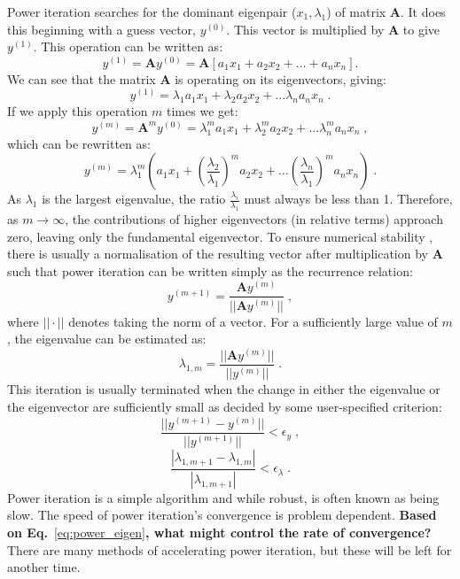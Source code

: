 \documentclass{article}
\begin{document}
Power iteration searches for the dominant eigenpair ($x_1,\lambda_1$) of matrix $\mathbf{A}$. It does this beginning with a guess vector, $y^{(0)}$. This vector is multiplied by $\mathbf{A}$ to give $y^{(1)}$. This operation can be written as:
\begin{equation}
    y^{(1)} = \mathbf{A}y^{(0)} = \mathbf{A}\left[a_1 x_1 + a_2 x_2 +\ldots + a_n x_n\right]\mathrm{.}
\end{equation}
We can see that the matrix $\mathbf{A}$ is operating on its eigenvectors, giving:
\begin{equation}
    y^{(1)} = \lambda_1 a_1 x_1 + \lambda_2 a_2 x_2 + \ldots \lambda_n a_n x_n\;\mathrm{.}
\end{equation}
If we apply this operation $m$ times we get:
\begin{equation}
    y^{(m)} = \mathbf{A}^m y^{(0)} = \lambda^m_1 a_1 x_1 + \lambda^m_2 a_2 x_2 + \ldots \lambda^m_n a_n x_n\;\mathrm{,}
\end{equation}
which can be rewritten as:
\begin{equation}\label{eq:power_eigen}
    y^{(m)} = \lambda^m_1 \left(a_1 x_1 + \left(\frac{\lambda_2}{\lambda_1}\right)^m a_2 x_2 + \ldots \left(\frac{\lambda_n}{\lambda_1}\right)^m  a_n x_n\right)\;\mathrm{.}
\end{equation}
As $\lambda_1$ is the largest eigenvalue, the ratio $\frac{\lambda_i}{\lambda_1}$ must always be less than 1. Therefore, as $m\rightarrow\infty$, the contributions of higher eigenvectors (in relative terms) approach zero, leaving only the fundamental eigenvector. To ensure numerical stability , there is usually a normalisation of the resulting vector after multiplication by $\mathbf{A}$ such that power iteration can be written simply as the recurrence relation:
\begin{equation}
    y^{(m+1)}=\frac{\mathbf{A}y^{(m)}}{||\mathbf{A}y^{(m)}||}\;\mathrm{,}
\end{equation}
where $||\cdot||$ denotes taking the norm of a vector. For a sufficiently large value of $m$, the eigenvalue can be estimated as:
\begin{equation}
    \lambda_{1,m} = \frac{||\mathbf{A}y^{(m)}||}{||y^{(m)}||}\;\mathrm{.}
\end{equation}
This iteration is usually terminated when the change in either the eigenvalue or the eigenvector are sufficiently small as decided by some user-specified criterion:
\begin{equation}
    \frac{||y^{(m+1)} - y^{(m)}||}{||y^{(m+1)}||}<\epsilon_y\;\mathrm{,}
\end{equation}
\begin{equation}
    \frac{|\lambda_{1,m+1} - \lambda_{1,m}|}{|\lambda_{1,m+1}|}<\epsilon_\lambda\;\mathrm{.}
\end{equation}
Power iteration is a simple algorithm and while robust, is often known as being slow. The speed of power iteration's convergence is problem dependent. \textbf{Based on Eq.}~\eqref{eq:power_eigen}\textbf{, what might control the rate of convergence?} There are many methods of accelerating power iteration, but these will be left for another time.
\end{document}
